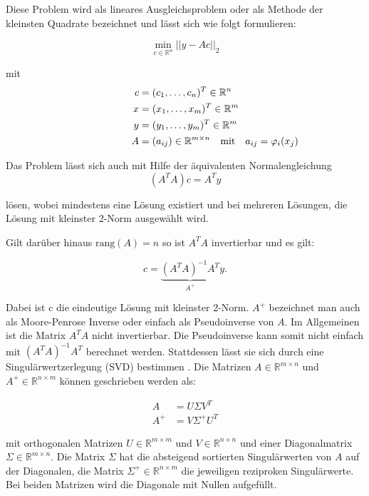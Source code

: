 Diese Problem wird als lineares Ausgleichsproblem oder als Methode der kleinsten Quadrate bezeichnet und lässt sich wie folgt formulieren:

\[
\min_{c\in\mathbb{R}^n} ||y - Ac||_2
\]

mit
\[
\begin{aligned}
c &= (c_1,\dotsc,c_n)^T\in\mathbb{R}^n \\
x &= (x_1,\dotsc,x_m)^T\in\mathbb{R}^m \\
y &= (y_1,\dotsc,y_m)^T\in\mathbb{R}^m \\
A &= (a_{ij})\in\mathbb{R}^{m\times n} \rlap{\quad\text{mit}\quad $a_{ij} = \varphi_i(x_j)$}
\end{aligned}
\]

Das Problem lässt sich auch mit Hilfe der äquivalenten Normalengleichung
\[
	(A^TA)c = A^Ty
\]

lösen, wobei mindestens eine Lösung existiert und bei mehreren Lösungen, die Lösung mit kleinster 2-Norm ausgewählt wird.

Gilt darüber hinaus $\text{rang}\left(A\right) = n$ so ist $A^TA$ invertierbar und es gilt:

\begin{equation}\label{eq:normaleq}
c = \underbrace{(A^TA)^{-1}A^T}_{A^+}y.
\end{equation}

Dabei ist c die eindeutige Lösung mit kleinster 2-Norm. $A^+$ bezeichnet man auch als Moore-Penrose Inverse oder einfach als Pseudoinverse von $A$. Im Allgemeinen ist die Matrix $A^TA$ nicht invertierbar. Die Pseudoinverse kann somit nicht einfach mit $(A^TA)^{-1}A^T$ berechnet werden. Stattdessen lässt sie sich durch eine Singulärwertzerlegung (SVD) bestimmen \cite{Stoer2011}. Die Matrizen $A\in\mathbb{R}^{m\times n}$ und $A^+\in\mathbb{R}^{n\times m}$ können geschrieben werden als:

\[
\begin{aligned}
A &= U\Sigma V^T \\
A^+ &= V\Sigma^+U^T
\end{aligned}
\]

mit orthogonalen Matrizen $U\in\mathbb{R}^{m\times m}$ und $V\in\mathbb{R}^{n\times n}$ und einer Diagonalmatrix $\Sigma\in\mathbb{R}^{m\times n}$.
Die Matrix $\Sigma$ hat die absteigend sortierten Singulärwerten von $A$ auf der Diagonalen, die Matrix $\Sigma^+\in\mathbb{R}^{n\times m}$ die jeweiligen reziproken Singulärwerte. Bei beiden Matrizen wird die Diagonale mit Nullen aufgefüllt.


